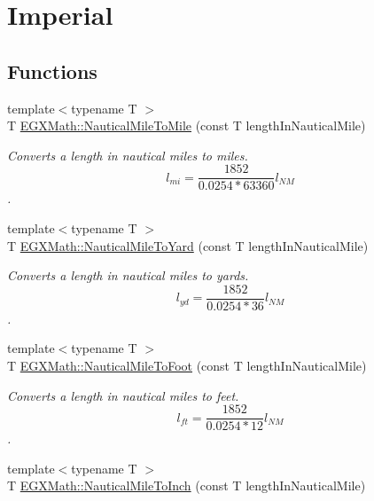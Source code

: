 \hypertarget{group___e_g_x_math-_conversions-_length_conversions-_non-_s_i-_nautical_mile-_imperial}{}\section{Imperial}
\label{group___e_g_x_math-_conversions-_length_conversions-_non-_s_i-_nautical_mile-_imperial}
\subsection*{Functions}
\begin{DoxyCompactItemize}
\item 
{\footnotesize template$<$typename T $>$ }\\T \mbox{\hyperlink{group___e_g_x_math-_conversions-_length_conversions-_non-_s_i-_nautical_mile-_imperial_ga9be4e73b064274bd79a406d7ed69d21f}{E\+G\+X\+Math\+::\+Nautical\+Mile\+To\+Mile}} (const T length\+In\+Nautical\+Mile)
\begin{DoxyCompactList}\small\item\em Converts a length in nautical miles to miles. \[ l_{mi}=\frac{1852}{0.0254 * 63360} l_{NM} \]. \end{DoxyCompactList}\item 
{\footnotesize template$<$typename T $>$ }\\T \mbox{\hyperlink{group___e_g_x_math-_conversions-_length_conversions-_non-_s_i-_nautical_mile-_imperial_ga649c499537b8934186bab8dcdee6d45e}{E\+G\+X\+Math\+::\+Nautical\+Mile\+To\+Yard}} (const T length\+In\+Nautical\+Mile)
\begin{DoxyCompactList}\small\item\em Converts a length in nautical miles to yards. \[ l_{yd}= \frac{1852}{0.0254 * 36}l_{NM} \]. \end{DoxyCompactList}\item 
{\footnotesize template$<$typename T $>$ }\\T \mbox{\hyperlink{group___e_g_x_math-_conversions-_length_conversions-_non-_s_i-_nautical_mile-_imperial_ga5c74e872b454cc243bb0d77f0d8f76a1}{E\+G\+X\+Math\+::\+Nautical\+Mile\+To\+Foot}} (const T length\+In\+Nautical\+Mile)
\begin{DoxyCompactList}\small\item\em Converts a length in nautical miles to feet. \[ l_{ft}= \frac{1852}{0.0254 * 12} l_{NM} \]. \end{DoxyCompactList}\item 
{\footnotesize template$<$typename T $>$ }\\T \mbox{\hyperlink{group___e_g_x_math-_conversions-_length_conversions-_non-_s_i-_nautical_mile-_imperial_ga5ec58ed7dbd23bcfb8290e1e476f354b}{E\+G\+X\+Math\+::\+Nautical\+Mile\+To\+Inch}} (const T length\+In\+Nautical\+Mile)

\end{DoxyCompactItemize}
